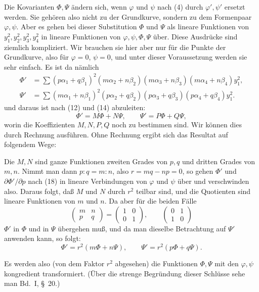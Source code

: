 \documentclass[11pt]{article}
\begin{document}
Die Kovarianten $\Phi,\Psi$ ändern sich, wenn $\varphi$ und $\psi$ nach (4) durch $\varphi',\psi'$ ersetzt werden. Sie gehören also nicht zu der Grundkurve, sondern zu dem Formenpaar $\varphi,\psi$. Aber es gehen bei dieser Substitution $\Phi$ und $\Psi$ als lineare Funktionen von $y_1^2,y_2^2,y_3^2,y_4^2$ in lineare Funktionen von $\varphi,\psi,\Phi,\Psi$ über. Diese Ausdrücke sind ziemlich kompliziert. Wir brauchen sie hier aber nur für die Punkte der Grundkurve, also für $\varphi=0$, $\psi=0$, und unter dieser Voraussetzung werden sie sehr einfach. Es ist da nämlich
\begin{equation}
\begin{aligned}
\Phi'&=\sum (p\alpha_1+q\beta_1)^2(m\alpha_2+n\beta_2)(m\alpha_3+n\beta_3)(m\alpha_4+n\beta_4)y_1^2,\\
\Psi'&=\sum (m\alpha_1+n\beta_1)^2(p\alpha_2+q\beta_2)(p\alpha_3+q\beta_3)(p\alpha_4+q\beta_4)y_1^2.
\end{aligned}
\tag{18}
\end{equation}
und daraus ist nach (12) und (14) abzuleiten:
\[
\Phi'=M\Phi+N\Psi,\qquad \Psi'=P\Phi+Q\Psi,
\]
worin die Koeffizienten $M,N,P,Q$ noch zu bestimmen sind. Wir können dies durch Rechnung ausführen. Ohne Rechnung ergibt sich das Resultat auf folgendem Wege:

Die $M,N$ sind ganze Funktionen zweiten Grades von $p,q$ und dritten Grades von $m,n$. Nimmt man dann $p:q=m:n$, also $r=mq-np=0$, so gehen $\Phi'$ und $\partial\Phi'/\partial p$ nach (18) in lineare Verbindungen von $\varphi$ und $\psi$ über und verschwinden also. Daraus folgt, daß $M$ und $N$ durch $r^2$ teilbar sind, und die Quotienten sind lineare Funktionen von $m$ und $n$. Da aber für die beiden Fälle
\[
\begin{pmatrix}m&n\\ p&q\end{pmatrix}=
\begin{pmatrix}1&0\\ 0&1\end{pmatrix},
\qquad
\begin{pmatrix}0&1\\ 1&0\end{pmatrix}
\]
$\Phi'$ in $\Phi$ und in $\Psi$ übergehen muß, und da man dieselbe Betrachtung auf $\Psi'$ anwenden kann, so folgt:
\begin{equation}
\Phi'=r^2(m\Phi+n\Psi),\qquad
\Psi'=r^2(p\Phi+q\Psi).
\tag{19}
\end{equation}

Es werden also (von dem Faktor $r^2$ abgesehen) die Funktionen $\Phi,\Psi$ mit den $\varphi,\psi$ kongredient transformiert. (Über die strenge Begründung dieser Schlüsse sehe man Bd.~I, \S~20.)
\end{document}
